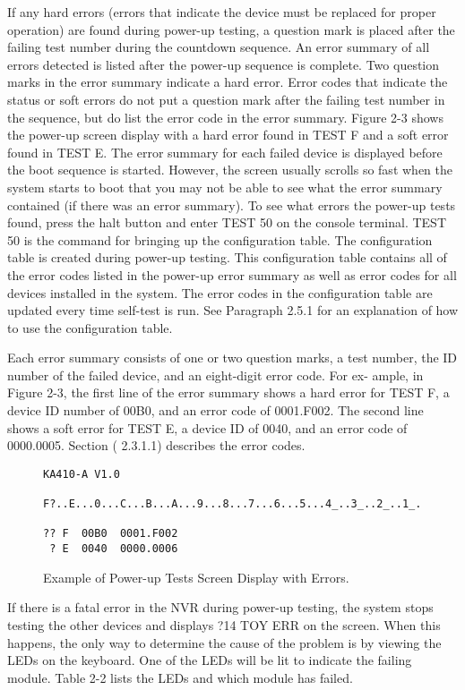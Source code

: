 \documentclass{decsectional}
\begin{document}
If any hard errors (errors that indicate the device must be replaced for
proper operation) are found during power-up testing, a question mark is
placed after the failing test number during the countdown sequence. An
error summary of all errors detected is listed after the power-up sequence
is complete. Two question marks in the error summary indicate a hard error.
Error codes that indicate the status or soft errors do not put a question mark
after the failing test number in the sequence, but do list the error code in the
error summary. Figure 2-3 shows the power-up screen display with a hard
error found in TEST F and a soft error found in TEST E. The error summary
for each failed device is displayed before the boot sequence is started.
However, the screen usually scrolls so fast when the system starts to boot
that you may not be able to see what the error summary contained (if there
was an error summary). To see what errors the power-up tests found, press
the halt button and enter TEST 50 on the console terminal. TEST 50 is the
command for bringing up the configuration table. The configuration table
is created during power-up testing. This configuration table contains all of
the error codes listed in the power-up error summary as well as error codes
for all devices installed in the system. The error codes in the configuration
table are updated every time self-test is run. See Paragraph 2.5.1 for an
explanation of how to use the configuration table.

Each error summary consists of one or two question marks, a test number,
the ID number of the failed device, and an eight-digit error code. For ex-
ample, in Figure 2-3, the first line of the error summary shows a hard error
for TEST F, a device ID number of 00B0, and an error code of 0001.F002.
The second line shows a soft error for TEST E, a device ID of 0040, and an
error code of 0000.0005. Section ( 2.3.1.1) describes the error codes.
\newpage
\begin{figure}[H]
\caption{Example of Power-up Tests Screen Display with Errors.}
\begin{verbatim}
KA410-A V1.0

F?..E...0...C...B...A...9...8...7...6...5...4_..3_..2_..1_..

?? F  00B0  0001.F002
 ? E  0040  0000.0006
\end{verbatim}
\end{figure}

If there is a fatal error in the NVR during power-up testing, the system stops
testing the other devices and displays ?14 TOY ERR on the screen. When
this happens, the only way to determine the cause of the problem is by
viewing the LEDs on the keyboard. One of the LEDs will be lit to indicate
the failing module. Table 2-2 lists the LEDs and which module has failed.
\end{document}
